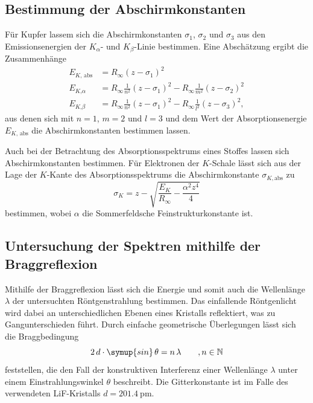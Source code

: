 \subsection{Bestimmung der Abschirmkonstanten}
\label{subsec:Abschirmkonstante}
Für Kupfer lassem sich die Abschirmkonstanten $\sigma_1$, $\sigma_2$ und $\sigma_3$ aus den Emissionsenergien der $K_\alpha$- und $K_\beta$-Linie bestimmen.
Eine Abschätzung ergibt die Zusammenhänge 
\begin{align}
    \label{eqn:Sigma_Kupfer}
    E_{K \text{, abs}} &= R_\infty (z - \sigma_1)^2 \\
    \label{eqn:Sigma_Kupfer2}
    E_{K \text{,} \alpha} &= R_\infty \frac{1}{n^2} (z - \sigma_1)^2 - R_\infty \frac{1}{m^2} (z - \sigma_2)^2 \\
    \label{eqn:Sigma_Kupfer3}
    E_{K \text{,} \beta} &= R_\infty \frac{1}{n^2} (z - \sigma_1)^2 - R_\infty \frac{1}{l^2} (z - \sigma_3)^2, 
\end{align}
aus denen sich mit $n = 1$, $m = 2$ und $l = 3$ und dem Wert der Absorptionsenergie $E_{K\text{, abs}}$ die Abschirmkonstanten bestimmen lassen.

Auch bei der Betrachtung des Absorptionsspektrums eines Stoffes lassen sich Abschirmkonstanten bestimmen. 
Für Elektronen der $K$-Schale lässt sich aus der Lage der $K$-Kante des Absorptionsspektrums die Abschirmkonstante $\sigma_{K, \text{abs}}$ zu 
\begin{equation}
    \label{eqn:Sigma_K}
    \sigma_K = z - \sqrt{\frac{E_K}{R_\infty} - \frac{\alpha^2 z^4}{4}}
\end{equation}
bestimmen, wobei $\alpha$ die Sommerfeldsche Feinstrukturkonstante ist.

\subsection{Untersuchung der Spektren mithilfe der Braggreflexion}
\label{subsec:Bragg}
Mithilfe der Braggreflexion lässt sich die Energie und somit auch die Wellenlänge $\lambda$ der untersuchten Röntgenstrahlung bestimmen. 
Das einfallende Röntgenlicht wird dabei an unterschiedlichen Ebenen eines Kristalls reflektiert, was zu Gangunterschieden führt. Durch einfache
geometrische Überlegungen lässt sich die Braggbedingung
\begin{equation}
    \label{eqn:Bragg}
    2 \, d \cdot \symup{sin} \, \theta = n \, \lambda \qquad , n \in \mathbb{N}
\end{equation}
feststellen, die den Fall der konstruktiven Interferenz einer Wellenlänge $\lambda$ unter einem Einstrahlungswinkel $\theta$ beschreibt.
Die Gitterkonstante ist im Falle des verwendeten LiF-Kristalls $d = \qty{201.4}{\pico\metre}$.
